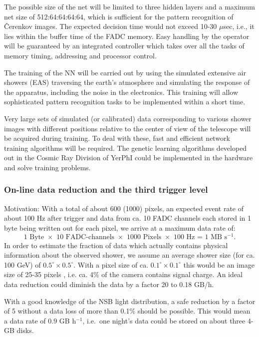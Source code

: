 The possible size of the net will be limited to three hidden layers and a
maximum net size of 512:64:64:64:64, which is sufficient for the pattern
recognition of \v{C}erenkov images. The expected decision time would not
exceed 10-30 $\mu$sec, i.e., it lies within the buffer time of the FADC
memory. Easy handling by the operator will be guaranteed by an integrated
controller which takes over all the tasks of memory timing, addressing and
processor control.

The training of the NN will be carried out by using
the simulated extensive
air showers (EAS) traversing the earth's atmosphere and simulating the 
response of the
apparatus, including the noise in the electronics. This training will allow
sophisticated pattern recognition tasks to be implemented within a 
short time.

Very large sets of simulated (or calibrated) data corresponding to various
shower images with different positions relative to the center of view of the
telescope will be acquired during training. To deal with these, fast and
efficient network training algorithms will be required. The genetic learning
algorithms developed out in the Cosmic Ray Division of YerPhI could be
implemented in the hardware and solve training problems.

\subsubsection{On-line data reduction and the third trigger level}


\medskip Motivation: With a total of about 600 (1000) pixels, an expected
event rate of about 100 Hz after trigger and data from ca. 10 FADC
channels each stored in 1 byte being written out for each pixel, we arrive
at a maximum data rate of: 
\[
\mbox{1 Byte $\times$ 10 FADC-channels $\times$ 1000 Pixels $\times$ 100 
Hz = 1 MB s$^{-1}$}. 
\]
In order to estimate the fraction of data which actually contains physical
information about the observed shower, we assume an average shower size (for
ca. 100 GeV) of $0.5^\circ \times 0.5^\circ$.
With a pixel size of ca. $0.1^\circ \times 0.1^\circ$ this would be an
image size of 25-35 pixels , i.e. ca. 4\% of the camera contains signal charge.
An ideal data reduction could diminish the data by a factor 20 to 0.18 GB/h.

With a good knowledge of the NSB light distribution, a safe reduction by a
factor of 5 without a data loss of more than 0.1\% should be possible. This
would mean a data rate of 0.9 GB h$^{-1}$, i.e.\ one night's data could be
stored on about three 4-GB disks.

